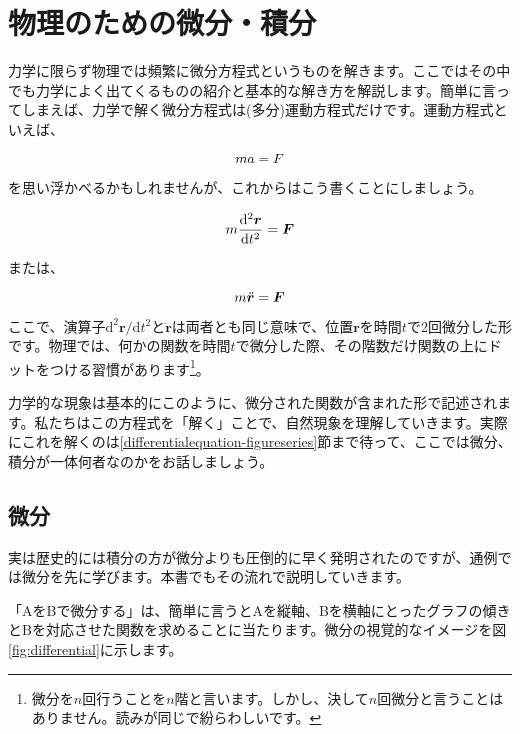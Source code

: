\chapter{物理のための微分・積分}
\label{differentialequation}
力学に限らず物理では頻繁に微分方程式というものを解きます。ここではその中でも力学によく出てくるものの紹介と基本的な解き方を解説します。簡単に言ってしまえば、力学で解く微分方程式は(多分)運動方程式だけです。運動方程式といえば、

\begin{equation}
    ma = F \notag
\end{equation}

を思い浮かべるかもしれませんが、これからはこう書くことにしましょう。

\begin{equation}
    m\frac{\mathrm{d^2}\bm{r}}{\mathrm{d}t^2} = \bm{F} \notag
\end{equation}

または、

\begin{equation}
    m\ddot{\bm{r}} = \bm{F} \notag
\end{equation}



ここで、演算子$\mathrm{d^2}\bm{r}/\mathrm{d}t^2$と$\ddot{\bm{r}}$は両者とも同じ意味で、位置$\bm{r}$を時間$t$で2回微分した形です。物理では、何かの関数を時間$t$で微分した際、その階数だけ関数の上にドットをつける習慣があります\footnote{微分を$n$回行うことを$n階$と言います。しかし、決して$n$回微分と言うことはありません。読みが同じで紛らわしいです。}。

力学的な現象は基本的にこのように、微分された関数が含まれた形で記述されます。私たちはこの方程式を「解く」ことで、自然現象を理解していきます。実際にこれを解くのは\ref{differentialequation-figureseries}節まで待って、ここでは微分、積分が一体何者なのかをお話しましょう。




\section{微分}
\label{differential}
実は歴史的には積分の方が微分よりも圧倒的に早く発明されたのですが、通例では微分を先に学びます。本書でもその流れで説明していきます。

「AをBで微分する」は、簡単に言うとAを縦軸、Bを横軸にとったグラフの傾きとBを対応させた関数を求めることに当たります。微分の視覚的なイメージを図\ref{fig:differential}に示します。

